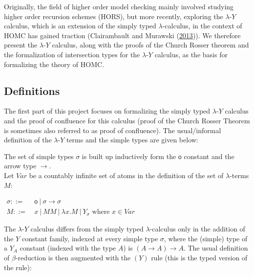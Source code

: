 \documentclass[a4paper, 12pt, twoside]{style/ociamthesis}
\theoremstyle{plain}
\theoremstyle{definition}
\newtheorem{Definition}{Definition}[chapter]
\theoremstyle{remark}
\newcommand{\lamy}{\lambda\text{-}Y}
\renewenvironment{Definition}{\begin{OldDefinition}\begin{mdframed}[style=example, linecolor=cyan]}{\end{mdframed}\end{OldDefinition}}
\begin{document}
Originally, the field of higher order model checking mainly involved
studying higher order recursion schemes (HORS), but more recently,
exploring the \(\lamy\) calculus, which is an extension of the simply
typed \(\lambda\)-calculus, in the context of HOMC has gained traction
(Clairambault and Murawski
(\protect\hyperlink{ref-clairambault13}{2013})). We therefore present
the \(\lamy\) calculus, along with the proofs of the Church Rosser
theorem and the formalization of intersection types for the \(\lamy\)
calculus, as the basis for formalizing the theory of HOMC.

\subsection{Definitions}\label{definitions}

The first part of this project focuses on formalizing the simply typed
\(\lamy\) calculus and the proof of confluence for this calculus (proof
of the Church Rosser Theorem is sometimes also referred to as proof of
confluence). The usual/informal definition of the \(\lamy\) terms and
the simple types are given below:

\begin{Definition}[$\lamy$ types and terms]

The set of simple types \(\sigma\) is built up inductively form the
\(\mathsf{o}\) constant and the arrow type \(\to\).\\
Let \(Var\) be a countably infinite set of atoms in the definition of
the set of \(\lambda\)-terms \(M\): \label{Definition:lamyTrms}

\begin{center}
$\begin{aligned}
\sigma ::=&\ \mathsf{o}\ |\ \sigma \to \sigma \\
M ::=&\ x\ |\ MM\ |\ \lambda x.M\ |\ Y_\sigma \text{ where }x \in Var
\end{aligned}$
\end{center}

\end{Definition}

The \(\lamy\) calculus differs from the simply typed
\(\lambda\)-calculus only in the addition of the \(Y\) constant family,
indexed at every simple type \(\sigma\), where the (simple) type of a
\(Y_A\) constant (indexed with the type \(A\)) is \((A \to A) \to A\).
The usual definition of \(\beta\)-reduction is then augmented with the
\((Y)\) rule (this is the typed version of the rule):
\end{document}
